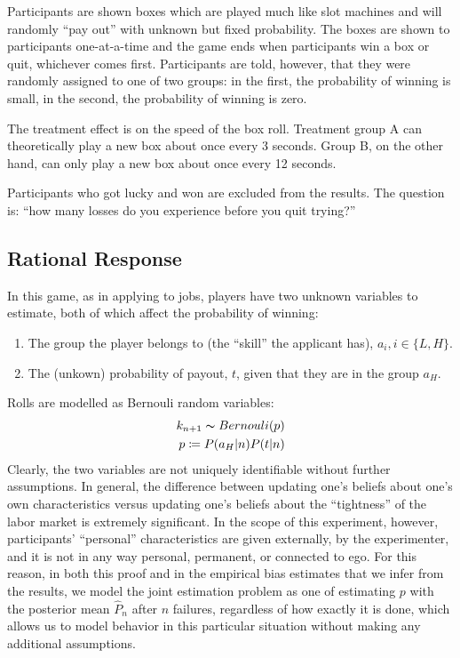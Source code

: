 \documentclass[a4paper,12pt]{article}
\begin{document}
Participants are shown boxes which are played much like slot machines and will randomly ``pay out'' with unknown but fixed probability. The boxes are shown to participants one-at-a-time and the game ends when participants win a box or quit, whichever comes first. Participants are told, however, that they were randomly assigned to one of two groups: in the first, the probability of winning is small, in the second, the probability of winning is zero.

The treatment effect is on the speed of the box roll. Treatment group A can theoretically play a new box about once every 3 seconds. Group B, on the other hand, can only play a new box about once every 12 seconds.

Participants who got lucky and won are excluded from the results. The question is: ``how many losses do you experience before you quit trying?''

\subsection{ Rational Response }

In this game, as in applying to jobs, players have two unknown variables to estimate, both of which affect the probability of winning:

\begin{enumerate}
\item The group the player belongs to (the ``skill'' the applicant has), $a_i, i \in \{L,H\}$.
\item The (unkown) probability of payout, $t$, given that they are in the group $a_H$.
\end{enumerate}
%
Rolls are modelled as Bernouli random variables:
\begin{align*}
k_{n+1} \thicksim Bernouli( p ) \\
p \coloneqq P(a_H | n)P(t | n)
\end{align*}
Clearly, the two variables are not uniquely identifiable without further assumptions. In general, the difference between updating one's beliefs about one's own characteristics versus updating one's beliefs about the ``tightness'' of the labor market is extremely significant. In the scope of this experiment, however, participants' ``personal'' characteristics are given externally, by the experimenter, and it is not in any way personal, permanent, or connected to ego. For this reason, in both this proof and in the empirical bias estimates that we infer from the results, we model the joint estimation problem as one of estimating $p$ with the posterior mean $\hat{P}_n$ after $n$ failures, regardless of how exactly it is done, which allows us to model behavior in this particular situation without making any additional assumptions.
\end{document}
